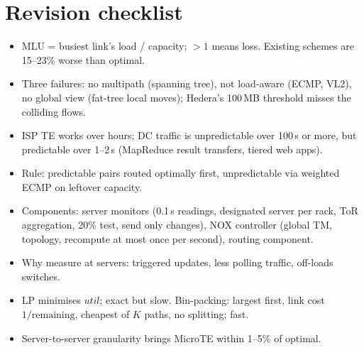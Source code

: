 \section{Revision checklist}
\begin{itemize}
  \item MLU = busiest link's load / capacity; $>1$ means loss. Existing schemes are 15--23\% worse than optimal.
  \item Three failures: no multipath (spanning tree), not load-aware (ECMP, VL2), no global view (fat-tree local moves); Hedera's 100\,MB threshold misses the colliding flows.
  \item ISP TE works over hours; DC traffic is unpredictable over 100\,s or more, but predictable over 1--2\,s (MapReduce result transfers, tiered web apps).
  \item Rule: predictable pairs routed optimally first, unpredictable via weighted ECMP on leftover capacity.
  \item Components: server monitors (0.1\,s readings, designated server per rack, ToR aggregation, 20\% test, send only changes), NOX controller (global TM, topology, recompute at most once per second), routing component.
  \item Why measure at servers: triggered updates, less polling traffic, off-loads switches.
  \item LP minimises $util$; exact but slow. Bin-packing: largest first, link cost $1/\text{remaining}$, cheapest of $K$ paths, no splitting; fast.
  \item Server-to-server granularity brings MicroTE within 1--5\% of optimal.
\end{itemize}
